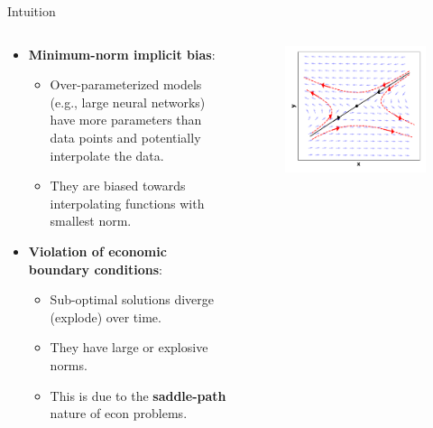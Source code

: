 \documentclass[aspectratio=169,10pt]{beamer}
\newcommand{\emphcolor}[1]{\textbf{\textcolor{emphcolorval}{#1}}}
\begin{document}
\begin{frame}{Intuition}
	\begin{columns}
		\begin{column}{0.5\textwidth}
			\begin{itemize}
				\item \emphcolor{Minimum-norm implicit bias}: 
				\begin{itemize}
					\item Over-parameterized models (e.g., large neural networks) have more parameters than data points and potentially interpolate the data.
					\vspace{0.05in}
					\item They are biased towards interpolating functions with smallest norm. 
				\end{itemize}
				\vspace{0.1in}
				\item \emphcolor{Violation of economic boundary conditions}:
				\begin{itemize}
					\item Sub-optimal solutions diverge (explode) over time.
					\vspace{0.05in}
					\item They have large or explosive norms.
					\vspace{0.05in}
					\item This is due to the \emphcolor{saddle-path} nature of econ problems.
				\end{itemize}
			\end{itemize}
		\end{column}
		\begin{column}{0.5\textwidth}
		\begin{figure}[t!]
			\centering
			\includegraphics[width=\textwidth]{figs/saddle_path.pdf}
			\vspace{-7mm}
		\end{figure}
		\end{column}
	\end{columns}
\end{frame}
\end{document}
